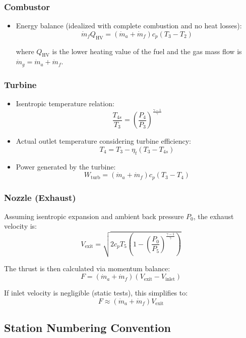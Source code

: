 \documentclass[
  12pt,
  oneside,
  a4paper,
  english,
  brazil]{abntex2}
\begin{document}
\subsubsection{Combustor}\label{combustor}

\begin{itemize}
    \item Energy balance (idealized with complete combustion and no heat losses):
$$
    \dot{m}_f Q_{\text{HV}} = (\dot{m}_a + \dot{m}_f) c_p (T_3 - T_2)
$$

    where $Q_{\text{HV}}$ is the lower heating value of the fuel and the gas mass flow is $\dot{m}_g = \dot{m}_a + \dot{m}_f$.
\end{itemize}

\subsubsection{Turbine}\label{turbine}

\begin{itemize}
    \item Isentropic temperature relation:
$$
    \frac{T_{4s}}{T_3} = \left( \frac{P_4}{P_3} \right)^{\frac{\gamma - 1}{\gamma}}
$$

    \item Actual outlet temperature considering turbine efficiency:
$$
    T_4 = T_3 - \eta_t (T_3 - T_{4s})
$$

    \item Power generated by the turbine:
$$
    W_{\text{turb}} = (\dot{m}_a + \dot{m}_f) c_p (T_3 - T_4)
$$

\end{itemize}

\subsubsection{Nozzle (Exhaust)}\label{nozzle-exhaust}

Assuming isentropic expansion and ambient back pressure \(P_0\), the
exhaust velocity is: \[
V_{\text{exit}} = \sqrt{2 c_p T_5 \left( 1 - \left( \frac{P_0}{P_5} \right)^{\frac{\gamma - 1}{\gamma}} \right)}
\]

The thrust is then calculated via momentum balance: \[
F = (\dot{m}_a + \dot{m}_f) (V_{\text{exit}} - V_{\text{inlet}})
\]

If inlet velocity is negligible (static tests), this simplifies to: \[
F \approx (\dot{m}_a + \dot{m}_f) V_{\text{exit}}
\]

\subsection{Station Numbering
Convention}\label{station-numbering-convention}
\end{document}
